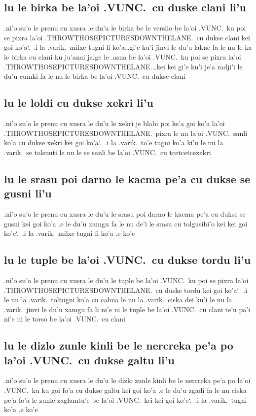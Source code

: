 \documentclass{report}
\newcommand\sds{\spacefactor\sfcode`.\ \space}
\begin{document}
\subsection{lu le birka be la'oi .VUNC.\ cu duske clani li'u}
.ni'o su'o le prenu cu xusra le du'u le birka be le versiio be la'oi .VUNC.\ ku poi se pixra la'oi .THROWTHOSEPICTURESDOWNTHELANE.\ cu dukse clani kei goi ko'a\sds  .i la .varik.\ milxe tugni fi ko'a\ldots gi'e ku'i jinvi le du'u lakne fa le nu le ka le birka cu clani ku ju'anai jalge le .asna be la'oi .VUNC.\ ku poi se pixra la'oi .THROWTHOSEPICTURESDOWNTHELANE.\ldots kei kei gi'e ku'i je'a radji'i le du'u cumki fa le nu le birka be la'oi .VUNC.\ cu dukse clani

\subsection{lu le loldi cu dukse xekri li'u}
.ni'o su'o le prenu cu xusra le du'u le xekri je blabi poi ke'a goi ko'a la'oi .THROWTHOSEPICTURESDOWNTHELANE.\ pixra le nu la'oi .VUNC.\ sanli ko'a cu dukse xekri kei goi ko'a\sds  .i la .varik.\ to'e tugni ko'a ki'u le nu la .varik.\ se tolsnuti le nu le se sanli be la'oi .VUNC.\ cu tcetcetcexekri

\subsection{lu le srasu poi darno le kacma pe'a cu dukse se gusni li'u}
.ni'o su'o le prenu cu xusra le du'u le srasu poi darno le kacma pe'a cu dukse se gusni kei goi ko'a .e le du'u xamgu fa le nu de'i le srasu cu tolgusibi'o kei kei goi ko'e\sds  .i la .varik.\ milxe tugni fi ko'a .e ko'e

\subsection{lu le tuple be la'oi .VUNC.\ cu dukse tordu li'u}
.ni'o su'o le prenu cu xusra le du'u le tuple be la'oi .VUNC.\ ku poi se pixra la'oi .THROWTHOSEPICTURESDOWNTHELANE.\ cu duske tordu kei goi ko'a\sds  .i le nu la .varik.\ toltugni ko'a cu cabna le nu la .varik.\ ciska dei ku'i le nu la .varik.\ jinvi  le du'u xamgu fa li ni'e ni le tuple be la'oi .VUNC.\ cu clani te'u pa'i ni'e ni le torso be la'oi .VUNC.\ cu clani

\subsection{lu le dizlo zunle kinli be le nercreka pe'a po la'oi .VUNC.\ cu dukse galtu li'u}
.ni'o su'o le prenu cu xusra le du'u le dizlo zunle kinli be le nercreka pe'a po la'oi .VUNC.\ ku ku goi fo'a cu dukse galtu kei goi ko'a .e le du'u zgadi fa le nu ciska pe'a fo'a le zunle zaglamtu'e be la'oi .VUNC.\ kei kei goi ko'e\sds  .i la .varik.\ tugni ko'a .e ko'e
\end{document}
